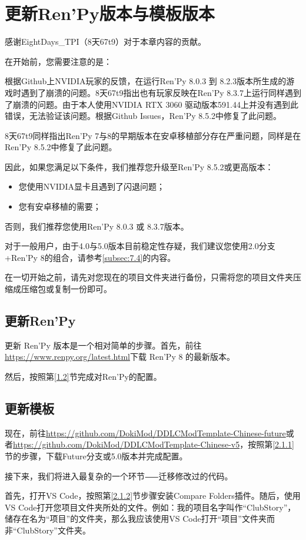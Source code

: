 \documentclass[../../Main.tex]{subfiles}
\begin{document}
\section{更新Ren'Py版本与模板版本}

感谢EightDays\_TPI（8天67t9）对于本章内容的贡献。

在开始前，您需要注意的是：

根据Github上NVIDIA玩家的反馈，在运行Ren'Py 8.0.3 到 8.2.3版本所生成的游戏时遇到了崩溃的问题。8天67t9指出也有玩家反映在Ren'Py 8.3.7上运行同样遇到了崩溃的问题。由于本人使用NVIDIA RTX 3060 驱动版本591.44上并没有遇到此错误，无法验证该问题。根据Github Issues，Ren'Py 8.5.2中修复了此问题。

8天67t9同样指出Ren'Py 7与8的早期版本在安卓移植部分存在严重问题，同样是在Ren'Py 8.5.2中修复了此问题。

因此，如果您满足以下条件，我们推荐您升级至Ren'Py 8.5.2或更高版本：
\begin{itemize}
    \item 您使用NVIDIA显卡且遇到了闪退问题；
    \item 您有安卓移植的需要；
\end{itemize}

否则，我们推荐您使用Ren'Py 8.0.3 或 8.3.7版本。

对于一般用户，由于4.0与5.0版本目前稳定性存疑，我们建议您使用2.0分支+Ren'Py 8的组合，请参考\ref{subsec:7.4}的内容。


在一切开始之前，请先对您现在的项目文件夹进行备份，只需将您的项目文件夹压缩成压缩包或复制一份即可。

\subsection{更新Ren'Py}
更新 Ren'Py 版本是一个相对简单的步骤。首先，前往\url{https://www.renpy.org/latest.html}下载 Ren'Py 8 的最新版本。

然后，按照第\ref{1.2}节完成对Ren'Py的配置。

\subsection{更新模板}
现在，前往\url{https://github.com/DokiMod/DDLCModTemplate-Chinese-future}或者\url{https://github.com/DokiMod/DDLCModTemplate-Chinese-v5}，按照第\ref{2.1.1}节的步骤，下载Future分支或5.0版本并完成配置。

接下来，我们将进入最复杂的一个环节⸺迁移修改过的代码。

首先，打开VS Code，按照第\ref{2.1.2}节步骤安装Compare Folders插件。随后，使用VS Code打开您项目文件夹所处的文件。例如：我的项目名字叫作“ClubStory”，储存在名为“项目”的文件夹，那么我应该使用VS Code打开“项目”文件夹而非“ClubStory”文件夹。
\end{document}
